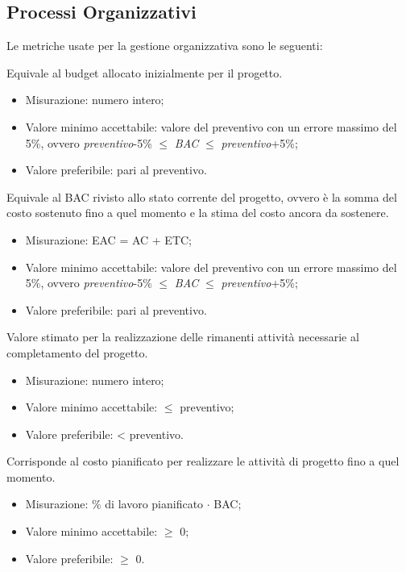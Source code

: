 \subsection{Processi Organizzativi}

	Le metriche usate per la gestione organizzativa sono le seguenti:
	
		Equivale al budget allocato inizialmente per il progetto.
		\begin{itemize}
			\item{Misurazione: numero intero;}
			\item{Valore minimo accettabile: valore del preventivo con un errore massimo del 5\%, ovvero \textit{preventivo}-5\% $\leq$ \textit{BAC} $\leq$ \textit{preventivo}+5\%;}
			\item{Valore preferibile: pari al preventivo.}
		\end{itemize}
		
		Equivale al BAC rivisto allo stato corrente del progetto, ovvero è la somma del costo sostenuto fino a quel momento e la stima del costo ancora da sostenere.
		\begin{itemize}
			\item{Misurazione: EAC = AC + ETC;}
			\item{Valore minimo accettabile: valore del preventivo con un errore massimo del 5\%, ovvero \textit{preventivo}-5\% $\leq$ \textit{BAC} $\leq$ \textit{preventivo}+5\%;}
			\item{Valore preferibile: pari al preventivo.}
		\end{itemize}
		
		Valore stimato per la realizzazione delle rimanenti attività necessarie al completamento del progetto.
		\begin{itemize}
			\item{Misurazione: numero intero;}
			\item{Valore minimo accettabile: $\leq$ preventivo;}
			\item{Valore preferibile: < preventivo.}
		\end{itemize}
		
		Corrisponde al costo pianificato per realizzare le attività di progetto fino a quel momento.
		\begin{itemize}
			\item{Misurazione: \% di lavoro pianificato $\cdot$ BAC;}
			\item{Valore minimo accettabile: $\geq$ 0;}
			\item{Valore preferibile: $\geq$ 0.}
		\end{itemize}
		
